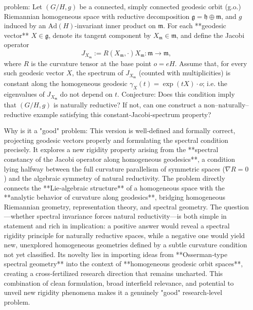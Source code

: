 problem:  
Let \( (G/H,g) \) be a connected, simply connected geodesic orbit (g.o.) Riemannian homogeneous space with reductive decomposition \( \mathfrak{g} = \mathfrak{h} \oplus \mathfrak{m} \), and \(g\) induced by an \( \mathrm{Ad}(H)\)-invariant inner product on \(\mathfrak{m}\).  
For each **geodesic vector** \(X\in \mathfrak{g}\), denote its tangent component by \(X_\mathfrak{m}\in \mathfrak{m}\), and define the Jacobi operator  
\[
J_{X_\mathfrak{m}} := R(X_\mathfrak{m},\cdot)X_\mathfrak{m} : \mathfrak{m}\to\mathfrak{m},
\]
where \(R\) is the curvature tensor at the base point \(o=eH\).  
Assume that, for every such geodesic vector \(X\), the spectrum of \(J_{X_\mathfrak{m}}\) (counted with multiplicities) is constant along the homogeneous geodesic \(\gamma_X(t)=\exp(tX)\cdot o\); i.e. the eigenvalues of \(J_{X_\mathfrak{m}}\) do not depend on \(t\).  
Conjecture: Does this condition imply that \( (G/H,g) \) is naturally reductive? If not, can one construct a non–naturally–reductive example satisfying this constant‑Jacobi‑spectrum property?  

Why is it a "good" problem:  
This version is well‑defined and formally correct, projecting geodesic vectors properly and formulating the spectral condition precisely. It explores a new rigidity property arising from the **spectral constancy of the Jacobi operator along homogeneous geodesics**, a condition lying halfway between the full curvature parallelism of symmetric spaces (\(\nabla R=0\)) and the algebraic symmetry of natural reductivity.  
The problem directly connects the **Lie‑algebraic structure** of a homogeneous space with the **analytic behavior of curvature along geodesics**, bridging homogeneous Riemannian geometry, representation theory, and spectral geometry. The question—whether spectral invariance forces natural reductivity—is both simple in statement and rich in implication: a positive answer would reveal a spectral rigidity principle for naturally reductive spaces, while a negative one would yield new, unexplored homogeneous geometries defined by a subtle curvature condition not yet classified.  
Its novelty lies in importing ideas from **Osserman‑type spectral geometry** into the context of **homogeneous geodesic orbit spaces**, creating a cross‑fertilized research direction that remains uncharted. This combination of clean formulation, broad interfield relevance, and potential to unveil new rigidity phenomena makes it a genuinely "good" research‑level problem.